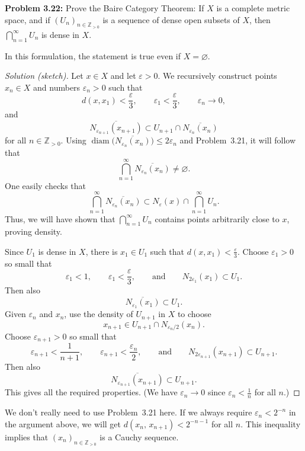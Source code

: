 \documentclass[10pt]{amsart}
\renewcommand{\S}{\subset}
\newcommand{\E}{\varnothing}
\renewcommand{\O}{\overline}
\newcommand{\I}{\infty}
\newcommand{\andeqn}{\qquad {\mbox{and}} \qquad}
\newcommand{\ep}{\varepsilon}
\newcommand{\N}{{\mathbb{Z}}_{> 0}}
\begin{document}
\vspace{2ex}

\noindent
{\textbf{Problem 3.22:}}
Prove the Baire Category Theorem:
If $X$ is a complete metric space,
and if $(U_n)_{n \in \N}$ is a sequence
of dense open subsets of $X$, then $\bigcap_{n = 1}^{\I} U_n$ is dense
in $X$.

\vspace{1ex}

In this formulation, the statement is true even if $X = \E$.

\begin{proof}[Solution (sketch)]
Let $x \in X$ and let $\ep > 0$.
We recursively construct points $x_n \in X$ and numbers $\ep_n > 0$
such that
\[
d (x, x_1) < \frac{\ep}{3}, \qquad \ep_1 < \frac{\ep}{3},
\qquad \ep_n \to 0,
\]
and
\[
\O{ N_{\ep_{n + 1}} (x_{n + 1} )} \S U_{n + 1} \cap \O{ N_{\ep_n} (x_n )}
\]
for all $n \in \N$.
Using ${\operatorname{diam}}
 \bigl( \O{ N_{\ep_n} (x_n )} \bigr) \leq 2 \ep_n$
and Problem~3.21, it will follow that
\[
\bigcap_{n = 1}^{\I} \O{ N_{\ep_n} (x_n ) } \neq \E.
\]
One easily checks that
\[
\bigcap_{n = 1}^{\I} \O{ N_{\ep_n} (x_n ) }
   \S N_{\ep} (x) \cap \bigcap_{n = 1}^{\I} U_n.
\]
Thus, we will have shown that $\bigcap_{n = 1}^{\I} U_n$ contains points
arbitrarily close to $x$, proving density.

Since $U_1$ is dense in $X$, there is $x_1 \in U_1$ such that
$d (x, x_1) < \frac{\ep}{3}$.
Choose $\ep_1 > 0$ so small that
\[
\ep_1 < 1,  \qquad \ep_1 < \frac{\ep}{3},
 \andeqn N_{2 \ep_1} (x_1 ) \S U_1.
\]
Then also
\[
\O{ N_{\ep_1} (x_1 )} \S U_1.
\]
Given $\ep_n$ and $x_n$,
use the density of $U_{n + 1}$ in $X$ to choose
\[
x_{n + 1} \in U_{n + 1} \cap N_{\ep_n / 2} (x_n ).
\]
Choose $\ep_{n + 1} > 0$ so small that
\[
\ep_{n + 1} < \frac{1}{n + 1},
 \qquad \ep_{n + 1} < \frac{\ep_n}{2},
 \andeqn N_{2 \ep_{n + 1}} (x_{n + 1} ) \S U_{n + 1}.
\]
Then also
\[
\O{ N_{\ep_{n + 1}} (x_{n + 1} )} \S U_{n + 1}.
\]
This gives all the required properties.
(We have $\ep_n \to 0$ since $\ep_n < \frac{1}{n}$ for all $n$.)
\end{proof}

We don't really need to use Problem~3.21 here.
If we always require $\ep_n < 2^{-n}$ in the argument above, we will
get $d (x_n, \, x_{n + 1}) < 2^{-n - 1}$ for all $n$.
This inequality implies that $(x_n)_{n \in \N}$ is a Cauchy sequence.
\end{document}
